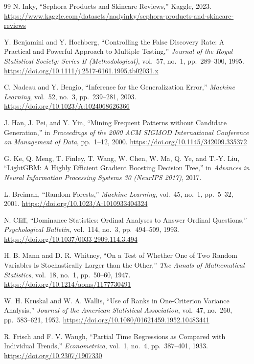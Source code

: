 \documentclass[11pt,a4paper]{article}
\begin{document}
\begin{thebibliography}{99}
N. Inky, ``Sephora Products and Skincare Reviews,'' Kaggle, 2023. \url{https://www.kaggle.com/datasets/nadyinky/sephora-products-and-skincare-reviews}

Y. Benjamini and Y. Hochberg, ``Controlling the False Discovery Rate: A Practical and Powerful Approach to Multiple Testing,'' \emph{Journal of the Royal Statistical Society: Series B (Methodological)}, vol.~57, no.~1, pp.~289--300, 1995. \url{https://doi.org/10.1111/j.2517-6161.1995.tb02031.x}

C. Nadeau and Y. Bengio, ``Inference for the Generalization Error,'' \emph{Machine Learning}, vol.~52, no.~3, pp.~239--281, 2003. \url{https://doi.org/10.1023/A:1024068626366}

J. Han, J. Pei, and Y. Yin, ``Mining Frequent Patterns without Candidate Generation,'' in \emph{Proceedings of the 2000 ACM SIGMOD International Conference on Management of Data}, pp.~1--12, 2000. \url{https://doi.org/10.1145/342009.335372}

G. Ke, Q. Meng, T. Finley, T. Wang, W. Chen, W. Ma, Q. Ye, and T.-Y. Liu, ``LightGBM: A Highly Efficient Gradient Boosting Decision Tree,'' in \emph{Advances in Neural Information Processing Systems 30 (NeurIPS 2017)}, 2017.

L. Breiman, ``Random Forests,'' \emph{Machine Learning}, vol.~45, no.~1, pp.~5--32, 2001. \url{https://doi.org/10.1023/A:1010933404324}

N. Cliff, ``Dominance Statistics: Ordinal Analyses to Answer Ordinal Questions,'' \emph{Psychological Bulletin}, vol.~114, no.~3, pp.~494--509, 1993. \url{https://doi.org/10.1037/0033-2909.114.3.494}

H. B. Mann and D. R. Whitney, ``On a Test of Whether One of Two Random Variables Is Stochastically Larger than the Other,'' \emph{The Annals of Mathematical Statistics}, vol.~18, no.~1, pp.~50--60, 1947. \url{https://doi.org/10.1214/aoms/1177730491}

W. H. Kruskal and W. A. Wallis, ``Use of Ranks in One-Criterion Variance Analysis,'' \emph{Journal of the American Statistical Association}, vol.~47, no.~260, pp.~583--621, 1952. \url{https://doi.org/10.1080/01621459.1952.10483441}

R. Frisch and F. V. Waugh, ``Partial Time Regressions as Compared with Individual Trends,'' \emph{Econometrica}, vol.~1, no.~4, pp.~387--401, 1933. \url{https://doi.org/10.2307/1907330}


\end{thebibliography}
\end{document}
